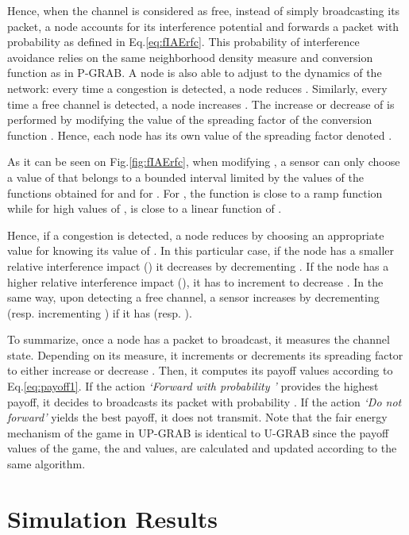 \documentclass[journal, peerreview, onecolumn, draftcls]{IEEEtran}
\begin{document}
Hence, when the channel is considered as free, instead of simply broadcasting its packet, a node  accounts for its interference potential and forwards a packet with probability  as defined in Eq.\eqref{eq:fIAErfc}.
This probability of interference avoidance relies on the same neighborhood density measure  and conversion function  as in P-GRAB.
A node is also able to adjust  to the dynamics of the network: every time a congestion is detected, a node reduces . Similarly, every time a free channel is detected, a node increases . The increase or decrease of  is performed by modifying the value of the spreading factor  of the conversion function . Hence, each node  has its own value of the spreading factor denoted .

As it can be seen on Fig.\ref{fig:fIAErfc}, when modifying , a sensor can only choose a value of  that belongs to a bounded interval limited by the values of the functions  obtained for  and for . For , the function is close to a ramp function while for high values of ,  is close to a linear function of .

Hence, if a congestion is detected, a node  reduces  by choosing an appropriate value for  knowing its value of . In this particular case, if the node has a smaller relative interference impact () it decreases  by decrementing . If the node has a higher relative interference impact (), it has to increment  to decrease .
In the same way, upon detecting a free channel, a sensor increases  by decrementing  (resp. incrementing ) if it has  (resp. ).

To summarize, once a node  has a packet to broadcast, it measures the channel state. Depending on its measure, it increments or decrements its spreading factor  to either increase or decrease . Then, it computes its payoff values according to Eq.\ref{eq:payoff1}. If the action {\it `Forward with probability '} provides the highest payoff, it decides to broadcasts its packet with probability . If the action {\it `Do not forward'} yields the best payoff, it does not transmit.
Note that the fair energy mechanism of the game in UP-GRAB is identical to U-GRAB since the payoff values of the game, the  and  values, are calculated and updated according to the same algorithm.

\section{Simulation Results}\label{sec:results}
\end{document}

